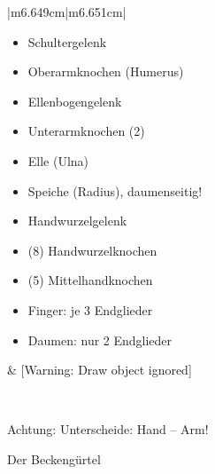 \documentclass{article}
\newcommand\gZ[1]{\textcolor[rgb]{0.5019608,0.5019608,0.5019608}{#1}}
\begin{document}
\begin{center}
\tablehead{}\begin{supertabular}{|m{6.649cm}|m{6.651cm}|}
\hline
\begin{itemize}
\item {\mdseries Schultergelenk}

\item {\mdseries Oberarmknochen  (Humerus)}

\item {\mdseries Ellenbogengelenk}

\item {\mdseries Unterarmknochen (2)}

\end{itemize}
\begin{itemize}
\item {\mdseries Elle  (Ulna) }

\item {\mdseries Speiche  (Radius), daumenseitig!}

\end{itemize}
\begin{itemize}
\item {\mdseries Handwurzelgelenk}

\item {\mdseries
\gZ{(}\gZ{8}\gZ{)}
Handwurzelknochen}

\item {\mdseries
\gZ{(}\gZ{5}\gZ{)}
Mittelhandknochen }

\item {\mdseries Finger: je 3  Endglieder}

\item {\mdseries Daumen: nur 2  Endglieder}

\end{itemize}
 &
[Warning: Draw object ignored]

\\\hline
\end{supertabular}
\end{center}
{\mdseries
Achtung: Unterscheide: Hand -- Arm!}

{\mdseries\color[rgb]{0.0,0.0,0.5019608}
Der Beckeng\"urtel}
\end{document}
